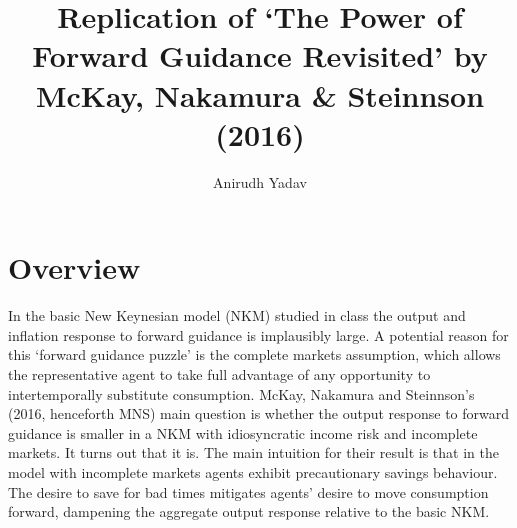 \documentclass[12pt]{article}
\title{Replication of `The Power of Forward Guidance Revisited' by McKay, Nakamura \& Steinnson (2016)}
\author{Anirudh Yadav}
\begin{document}
\maketitle

\setcounter{tocdepth}{2}
\tableofcontents

\newpage

\section{Overview}
In the basic New Keynesian model (NKM) studied in class the output and inflation response to forward guidance is implausibly large. A potential reason for this `forward guidance puzzle' is the complete markets assumption, which allows the representative agent to take full advantage of any opportunity to intertemporally substitute consumption. McKay, Nakamura and Steinnson's (2016, henceforth MNS) main question is whether the output response to forward guidance is smaller in a NKM with idiosyncratic income risk and incomplete markets. It turns out that it is. The main intuition for their result is that in the model with incomplete markets agents exhibit precautionary savings behaviour. The desire to save for bad times mitigates agents' desire to move consumption forward, dampening the aggregate output response relative to the basic NKM.
\end{document}
